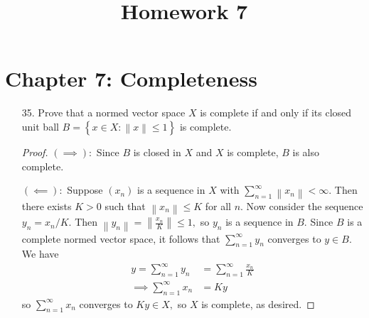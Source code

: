 \documentclass{article}
\begin{document}
\title{Homework 7} 
\maketitle
\thispagestyle{fancy}

\section*{Chapter 7: Completeness}

\begin{itemize}
	\item[35.] Prove that a normed vector space $X$ is complete if and only if its closed unit ball $B=\left\{ x\in X:\left\lVert x \right\rVert\le 1 \right\}$ is complete.
		\begin{proof}
			$(\implies):$ Since $B$ is closed in $X$ and $X$ is complete, $B$ is also complete.

			$(\impliedby):$ Suppose $(x_n)$ is a sequence in $X$ with $\sum_{n=1}^{\infty} \left\lVert x_n \right\rVert<\infty.$ Then there exists $K>0$ such that $\left\lVert x_n \right\rVert\le K$ for all $n.$ Now consider the sequence $y_n=x_n/K.$ Then $\left\lVert y_n \right\rVert = \left\lVert \frac{x_n}{K} \right\rVert \le 1,$ so $y_n$ is a sequence in $B.$ Since $B$ is a complete normed vector space, it follows that $\sum_{n=1}^{\infty} y_n$ converges to $y\in B.$ We have
			\begin{align*}
				y = \sum_{n=1}^{\infty} y_n &= \sum_{n=1}^{\infty} \frac{x_n}{K} \\
				\implies \sum_{n=1}^{\infty} x_n &= Ky
			\end{align*}
			so $\sum_{n=1}^{\infty} x_n$ converges to $Ky\in X,$ so $X$ is complete, as desired.
		\end{proof}


\end{itemize}
\end{document}
